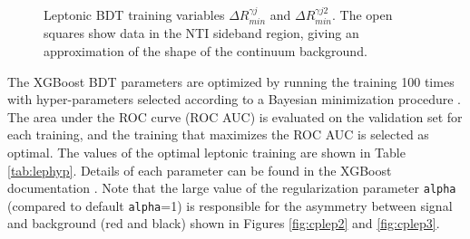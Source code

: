 \begin{figure}[htbp]
  \centering
  \caption{Leptonic BDT training variables $\Delta R_{min}^{\gamma j}$ and $\Delta R_{min}^{\gamma j2}$.  The open squares show data in the NTI sideband region, giving an approximation of the shape of the continuum background. }
  \label{fig:lepvbls7}
\end{figure}

\clearpage

The XGBoost BDT parameters are optimized by running the training 100 times with hyper-parameters selected according to a Bayesian minimization procedure \cite{skopt}. The area under the ROC curve (ROC AUC) is evaluated on the validation set for each training, and the training that maximizes the ROC AUC is selected as optimal. The values of the optimal leptonic training are shown in Table \ref{tab:lephyp}. Details of each parameter can be found in the XGBoost documentation \cite{xgboost}. Note that the large value of the regularization parameter \texttt{alpha} (compared to default \texttt{alpha}=1) is responsible for the asymmetry between signal and background (red and black) shown in Figures \ref{fig:cplep2} and \ref{fig:cplep3}.

